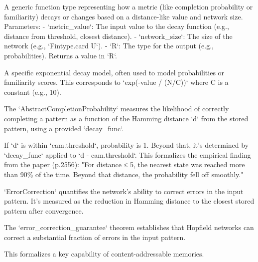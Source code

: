 \begin{definition}\label{MetricDecayFunction}
\leanok
A generic function type representing how a metric (like completion probability or familiarity)
decays or changes based on a distance-like value and network size.
Parameters:
- `metric_value`: The input value to the decay function (e.g., distance from threshold, closest distance).
- `network_size`: The size of the network (e.g., `Fintype.card U`).
- `R`: The type for the output (e.g., probabilities).
Returns a value in `R`.
\end{definition}

\begin{definition}\label{ExponentialDecayMetric}
\leanok
A specific exponential decay model, often used to model probabilities or familiarity scores.
This corresponds to `exp(-value / (N/C))` where C is a constant (e.g., 10).
\end{definition}

\begin{definition}\label{AbstractCompletionProbability}
\leanok
The `AbstractCompletionProbability` measures the likelihood of correctly completing a pattern
as a function of the Hamming distance `d` from the stored pattern, using a provided `decay_func`.

If `d` is within `cam.threshold`, probability is 1. Beyond that, it's determined by `decay_func`
applied to `d - cam.threshold`.
This formalizes the empirical finding from the paper (p.2556):
"For distance ≤ 5, the nearest state was reached more than 90\% of the time.
Beyond that distance, the probability fell off smoothly."
\end{definition}

\begin{definition}\label{ErrorCorrection}
`ErrorCorrection` quantifies the network's ability to correct errors in the input pattern.
It's measured as the reduction in Hamming distance to the closest stored pattern after convergence.
\leanok
\end{definition}

\begin{definition}\label{error_correction_guarantee}
\leanok
The `error_correction_guarantee` theorem establishes that Hopfield networks
can correct a substantial fraction of errors in the input pattern.

This formalizes a key capability of content-addressable memories.
\end{definition}

